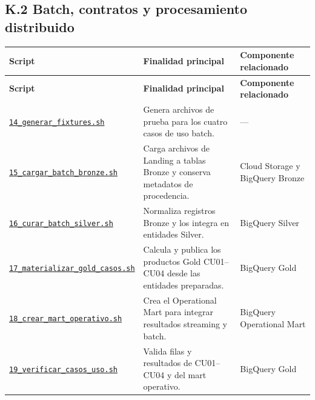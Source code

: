 \documentclass[11pt]{article}
\begin{document}
\endgroup

\subsection*{K.2 Batch, contratos y procesamiento distribuido}
\begingroup\scriptsize
\begin{longtable}{@{}>{\raggedright\arraybackslash}p{}>{\raggedright\arraybackslash}p{}>{\raggedright\arraybackslash}p{}@{}}
\toprule
\textbf{Script} & \textbf{Finalidad principal} & \textbf{Componente relacionado} \\
\midrule
\endfirsthead
\toprule
\textbf{Script} & \textbf{Finalidad principal} & \textbf{Componente relacionado} \\
\midrule
\endhead
\href{https://github.com/Codenid/lumina-retail-data-platform/blob/main/implementation/automatizacion/scripts14_generar_fixtures.sh}{\texttt{14\_\allowbreak{}generar\_\allowbreak{}fixtures.sh}} & Genera archivos de prueba para los cuatro casos de uso batch. & — \\
\href{https://github.com/Codenid/lumina-retail-data-platform/blob/main/implementation/automatizacion/scripts15_cargar_batch_bronze.sh}{\texttt{15\_\allowbreak{}cargar\_\allowbreak{}batch\_\allowbreak{}bronze.sh}} & Carga archivos de Landing a tablas Bronze y conserva metadatos de procedencia. & Cloud Storage y BigQuery Bronze \\
\href{https://github.com/Codenid/lumina-retail-data-platform/blob/main/implementation/automatizacion/scripts16_curar_batch_silver.sh}{\texttt{16\_\allowbreak{}curar\_\allowbreak{}batch\_\allowbreak{}silver.sh}} & Normaliza registros Bronze y los integra en entidades Silver. & BigQuery Silver \\
\href{https://github.com/Codenid/lumina-retail-data-platform/blob/main/implementation/automatizacion/scripts17_materializar_gold_casos.sh}{\texttt{17\_\allowbreak{}materializar\_\allowbreak{}gold\_\allowbreak{}casos.sh}} & Calcula y publica los productos Gold CU01–CU04 desde las entidades preparadas. & BigQuery Gold \\
\href{https://github.com/Codenid/lumina-retail-data-platform/blob/main/implementation/automatizacion/scripts18_crear_mart_operativo.sh}{\texttt{18\_\allowbreak{}crear\_\allowbreak{}mart\_\allowbreak{}operativo.sh}} & Crea el Operational Mart para integrar resultados streaming y batch. & BigQuery Operational Mart \\
\href{https://github.com/Codenid/lumina-retail-data-platform/blob/main/implementation/automatizacion/scripts19_verificar_casos_uso.sh}{\texttt{19\_\allowbreak{}verificar\_\allowbreak{}casos\_\allowbreak{}uso.sh}} & Valida filas y resultados de CU01–CU04 y del mart operativo. & BigQuery Gold \\

\end{longtable}
\end{document}
